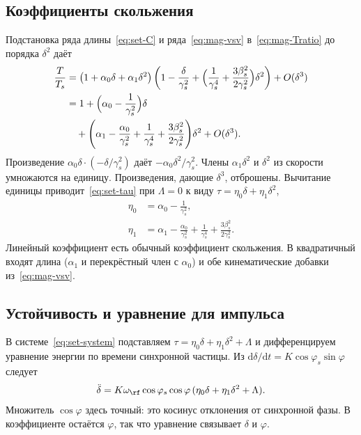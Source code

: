 \subsection{Коэффициенты скольжения}

Подстановка ряда длины~\eqref{eq:set-C} и ряда~\eqref{eq:mag-vsv} в~\eqref{eq:mag-Tratio} до порядка $\delta^2$ даёт
\begin{align}
\frac{T}{T_s}
&=
\bigl(1+\alpha_0\delta+\alpha_1\delta^2\bigr)
\left(
1-\frac{\delta}{\gamma_s^2}
+\Bigl(\frac{1}{\gamma_s^4}+\frac{3\beta_s^2}{2\gamma_s^2}\Bigr)\delta^2
\right)
+O(\delta^3)
\nonumber\\
&=
1+\Bigl(\alpha_0-\frac{1}{\gamma_s^2}\Bigr)\delta
\nonumber\\
&\quad
+\Biggl(
\alpha_1-\frac{\alpha_0}{\gamma_s^2}
+\frac{1}{\gamma_s^4}
+\frac{3\beta_s^2}{2\gamma_s^2}
\Biggr)\delta^2
+O(\delta^3).
\label{eq:mag-product}
\end{align}
Произведение $\alpha_0\delta\cdot(-\delta/\gamma_s^2)$ даёт $-\alpha_0\delta^2/\gamma_s^2$. Члены $\alpha_1\delta^2$ и $\delta^2$ из скорости умножаются на единицу. Произведения, дающие $\delta^3$, отброшены. Вычитание единицы приводит~\eqref{eq:set-tau} при $\Lambda=0$ к виду $\tau=\eta_0\delta+\eta_1\delta^2$,
\begin{align}
\eta_0&=\alpha_0-\frac{1}{\gamma_s^2},
\label{eq:mag-eta0}\\
\eta_1&=
\alpha_1-\frac{\alpha_0}{\gamma_s^2}
+\frac{1}{\gamma_s^4}
+\frac{3\beta_s^2}{2\gamma_s^2}.
\label{eq:mag-eta1}
\end{align}
Линейный коэффициент есть обычный коэффициент скольжения. В квадратичный входят длина ($\alpha_1$ и перекрёстный член с $\alpha_0$) и обе кинематические добавки из~\eqref{eq:mag-vsv}.

\subsection{Устойчивость и уравнение для импульса}

В системе~\eqref{eq:set-system} подставляем $\tau=\eta_0\delta+\eta_1\delta^2+\Lambda$ и дифференцируем уравнение энергии по времени синхронной частицы. Из $\mathrm{d}\delta/\mathrm{d}t=K\cos\varphi_s\sin\varphi$ следует
\begin{equation}
\label{eq:mag-dd}
\ddot\delta
=K\omega_\rf\cos\varphi_s\cos\varphi\,
(\eta_0\delta+\eta_1\delta^2+\Lambda).
\end{equation}
Множитель $\cos\varphi$ здесь точный: это косинус отклонения от синхронной фазы. В коэффициенте остаётся $\varphi$, так что уравнение связывает $\delta$ и $\varphi$.

